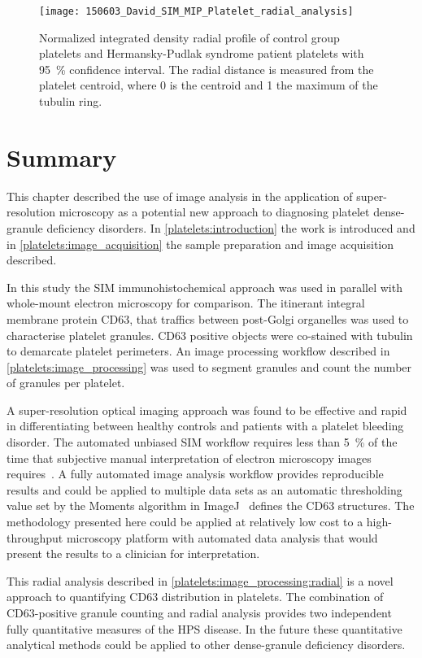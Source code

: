 \begin{figure}[htbp]{}
	\centering
	\texttt{[image: 150603\_David\_SIM\_MIP\_Platelet\_radial\_analysis]}
\caption[Normalized radial profile of CD63 distribution in platelets]{Normalized integrated density radial profile of control group platelets and Hermansky-Pudlak syndrome patient platelets with \SI{95}{\percent} confidence interval. The radial distance is measured from the platelet centroid, where 0 is the centroid and 1 the maximum of the tubulin ring.}
	\label{figure:platelets:results:radial_analysis}
\end{figure}


\section{Summary}
\label{platelets:summary}
This chapter described the use of image analysis in the application of super-resolution microscopy as a potential new approach to diagnosing platelet dense-granule deficiency disorders. In \autoref{platelets:introduction} the work is introduced and in \autoref{platelets:image_acquisition} the sample preparation and image acquisition described.

In this study the SIM immunohistochemical approach was used in parallel with whole-mount electron microscopy for comparison. The itinerant integral membrane protein CD63, that traffics between post-Golgi organelles was used to characterise platelet granules. CD63 positive objects were co-stained with tubulin to demarcate platelet perimeters. An image processing workflow described in \autoref{platelets:image_processing} was used to segment granules and count the number of granules per platelet.

A super-resolution optical imaging approach was found to be effective and rapid in differentiating between healthy controls and patients with a platelet bleeding disorder. The automated unbiased SIM workflow requires less than \SI{5}{\percent} of the time that subjective manual interpretation of electron microscopy images requires~\cite{Westmoreland2016}. A fully automated image analysis workflow provides reproducible results and could be applied to multiple data sets as an automatic thresholding value set by the Moments algorithm in ImageJ~\cite{Schneider2012} defines the CD63 structures. The methodology presented here could be applied at relatively low cost to a high-throughput microscopy platform with automated data analysis that would present the results to a clinician for interpretation.

This radial analysis described in \autoref{platelets:image_processing:radial} is a novel approach to quantifying CD63 distribution in platelets. The combination of CD63-positive granule counting and radial analysis provides two independent fully quantitative measures of the HPS disease. In the future these quantitative analytical methods could be applied to other dense-granule deficiency disorders.

